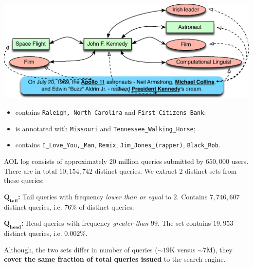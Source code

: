\documentclass[a0,portrait,final]{a0poster}
\newcommand{\tail}[1]{$\mathbf{Q_{tail}}${}}
\newcommand{\head}[1]{$\mathbf{Q_{head}}${}}
\newcommand{\pbox}[3]{
	\begin{center}
	\psshadowbox[linewidth=2mm,framearc=0.1,framesep=1em,shadowsize=4mm,shadowcolor=lightgray,linecolor=#2]{
		\begin{minipage}[t][][t]{#1}{
			#3 %
		}\end{minipage}
	}
	\end{center}
}
\newlength\ptitlespace
\newcommand{\ptitle}[1]{
	\vspace{\ptitlespace}
	\pbox{0.92\columnwidth}{arancioneisti}{
		\begin{center}
		\textsc{\LARGE\bluisti{#1}} %
		\end{center}
	}
	\vspace{0.5\ptitlespace}
}
\begin{document}
\begin{multicols}{2}
\vspace{5mm}
\begin{center}
\includegraphics[width=0.92\columnwidth]{img/annotation-example.eps}
\end{center}
\begin{itemize}
\item {} contains
\texttt{Raleigh,\_North\_Carolina} and \texttt{First\_Citizens\_Bank};
\item {} is annotated
with \texttt{Missouri} and  \texttt{Tennessee\_Walking\_Horse};
\item {} contains  \texttt{I\_Love\_You,\_Man},
\texttt{Remix}, \texttt{Jim\_Jones\_(rapper)}, \texttt{Black\_Rob}.
 \end{itemize}


\ptitle{Analysis}

AOL log consists of approximately 20 million queries submitted by $650,000$ users. There are in total $10,154,742$ distinct queries. 
We extract 2 distinct sets from these queries: 
\begin{description}
	\item{\textbf{\tail{}:}} Tail queries with frequency \emph{lower than or equal} to $2$. Contains $7,746,607$ distinct queries, i.e. $76\%$ of distinct queries. %
	\item{\textbf{\head{}:}} Head queries with frequency \emph{greater than} $99$. The set contains $19,953$ distinct queries, i.e. $0.002\%$. %
\end{description}
Although, the two sets differ in number of queries ($\sim19$K versus $\sim7$M), they \textbf{cover the same fraction of total queries issued} to the search engine. %



\end{multicols}
\end{document}
